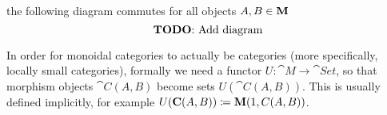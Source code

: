 \begin{definition}
\begin{thmenum}
    \item the following diagram commutes for all objects \( A, B \in \operatorname{\mathbf{M}} \)
    \begin{equation*}
      \text{\todo{Add diagram}}\iffalse\begin{mplibcode}
        u := 2cm;

        beginfig(1);
        input metapost/graphs;

        v1 := thelabel("$C(A, B)$", origin);
        v2 := thelabel("$C(B, B) \otimes C(A, B)$", (-2, 1) scaled u);
        v3 := thelabel("$1 \otimes C(A, B)$", (-2, -1) scaled u);
        v4 := thelabel("$C(A, B) \otimes C(A, A)$", (2, 1) scaled u);
        v5 := thelabel("$C(A, B) \otimes 1$", (2, -1) scaled u);

        a1 := straight_arc(v2, v1);
        a2 := straight_arc(v4, v1);
        a3 := straight_arc(v3, v1);
        a4 := straight_arc(v5, v1);
        a5 := straight_arc(v3, v2);
        a6 := straight_arc(v5, v4);

        draw_vertices(v);
        draw_arcs(a);

        label.urt("$\circ_{A, B, B}$", straight_arc_midpoint of a1);
        label.ulft("$\circ_{A, A, B}$", straight_arc_midpoint of a2);
        label.lrt("$\lambda$", straight_arc_midpoint of a3);
        label.llft("$\rho$", straight_arc_midpoint of a4);
        label.lft("$j_B \otimes \id_{C(A, B)}$", straight_arc_midpoint of a5);
        label.rt("$\id_{C(A, B)} \otimes j_A$", straight_arc_midpoint of a6);
        endfig;
      \end{mplibcode}\fi
    \end{equation*}
  \end{thmenum}

  In order for monoidal categories to actually be categories (more specifically, locally small categories), formally we need a functor \( U: \cat{M} \to \cat{Set} \), so that morphism objects \( \cat{C}(A, B) \) become sets \( U(\cat{C}(A, B)) \). This is usually defined implicitly, for example \( U(\operatorname{\mathbf{C}}(A, B)) \coloneqq \operatorname{\mathbf{M}}(1, C(A, B)) \).
\end{definition}
